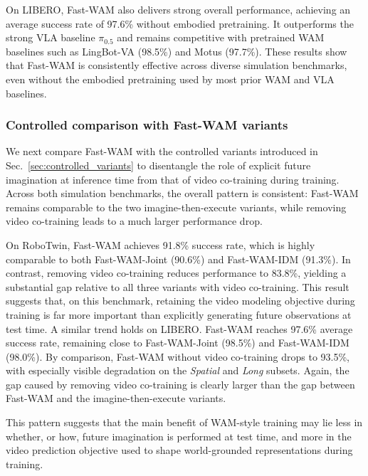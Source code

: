 \documentclass{article}
\begin{document}
On LIBERO, Fast-WAM also delivers strong overall performance, achieving an average success rate of 97.6\% without embodied pretraining. It outperforms the strong VLA baseline $\pi_{0.5}$ and remains competitive with pretrained WAM baselines such as LingBot-VA (98.5\%) and Motus (97.7\%). These results show that Fast-WAM is consistently effective across diverse simulation benchmarks, even without the embodied pretraining used by most prior WAM and VLA baselines.

\subsubsection{Controlled comparison with Fast-WAM variants}

We next compare Fast-WAM with the controlled variants introduced in Sec.~\ref{sec:controlled_variants} to disentangle the role of explicit future imagination at inference time from that of video co-training during training. Across both simulation benchmarks, the overall pattern is consistent: Fast-WAM remains comparable to the two imagine-then-execute variants, while removing video co-training leads to a much larger performance drop.

On RoboTwin, Fast-WAM achieves 91.8\% success rate, which is highly comparable to both Fast-WAM-Joint (90.6\%) and Fast-WAM-IDM (91.3\%). In contrast, removing video co-training reduces performance to 83.8\%, yielding a substantial gap relative to all three variants with video co-training. This result suggests that, on this benchmark, retaining the video modeling objective during training is far more important than explicitly generating future observations at test time. A similar trend holds on LIBERO. Fast-WAM reaches 97.6\% average success rate, remaining close to Fast-WAM-Joint (98.5\%) and Fast-WAM-IDM (98.0\%). By comparison, Fast-WAM without video co-training drops to 93.5\%, with especially visible degradation on the \textit{Spatial} and \textit{Long} subsets. Again, the gap caused by removing video co-training is clearly larger than the gap between Fast-WAM and the imagine-then-execute variants.

This pattern suggests that the main benefit of WAM-style training may lie less in whether, or how, future imagination is performed at test time, and more in the video prediction objective used to shape world-grounded representations during training.
\end{document}
